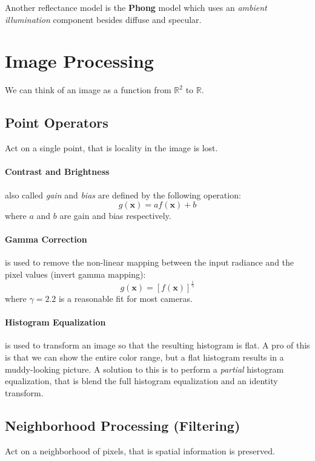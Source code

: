 \documentclass[a4paper,twocolumn]{article}
\begin{document}
Another reflectance model is the \textbf{Phong} model which uses an
\textit{ambient illumination} component besides diffuse and specular.


\section{Image Processing}
We can think of an image as a function from $\mathbb{R}^2$ to $\mathbb{R}$.

\subsection{Point Operators}
Act on a single point, that is locality in the image is lost.
\paragraph{Contrast and Brightness} also called \textit{gain} and
\textit{bias} are defined by the following operation:
\begin{equation}
g(\mathbf{x}) = a f(\mathbf{x}) + b
\end{equation}
where $a$ and $b$ are gain and bias respectively.
\paragraph{Gamma Correction} is used to remove the non-linear mapping between
the input radiance and the pixel values (invert gamma mapping):
\begin{equation}
g(\mathbf{x}) = [f(\mathbf{x})]^{\frac{1}{\gamma}}
\end{equation}
where $\gamma = 2.2$ is a reasonable fit for most cameras.
\paragraph{Histogram Equalization} is used to transform an image so that the
resulting histogram is flat. A pro of this is that we can show the entire color
range, but a flat histogram results in a muddy-looking picture. A solution to
this is to perform a \textit{partial} histogram equalization, that is blend the
full histogram equalization and an identity transform.

\subsection{Neighborhood Processing (Filtering)}
Act on a neighborhood of pixels, that is spatial information is preserved.
\end{document}
